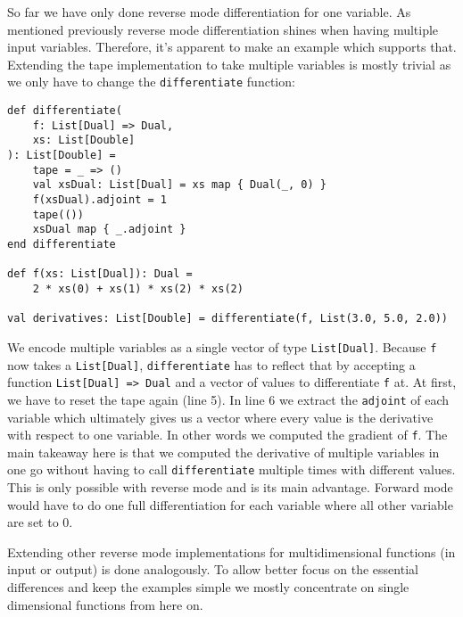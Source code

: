 So far we have only done reverse mode differentiation for one variable. As mentioned previously reverse mode differentiation shines when having multiple input variables. Therefore, it's apparent to make an example which supports that. Extending the tape implementation to take multiple variables is mostly trivial as we only have to change the \lstinline{differentiate} function:
\begin{lstlisting}
def differentiate(
    f: List[Dual] => Dual, 
    xs: List[Double]
): List[Double] =
    tape = _ => ()
    val xsDual: List[Dual] = xs map { Dual(_, 0) }
    f(xsDual).adjoint = 1
    tape(())
    xsDual map { _.adjoint }
end differentiate

def f(xs: List[Dual]): Dual =
    2 * xs(0) + xs(1) * xs(2) * xs(2)

val derivatives: List[Double] = differentiate(f, List(3.0, 5.0, 2.0))
\end{lstlisting}
We encode multiple variables as a single vector of type \lstinline{List[Dual]}. Because \lstinline{f} now takes a \lstinline{List[Dual]}, \lstinline{differentiate} has to reflect that by accepting a function \lstinline{List[Dual] => Dual} and a vector of values to differentiate \lstinline{f} at. At first, we have to reset the tape again (line 5). In line 6 we extract the \lstinline{adjoint} of each variable which ultimately gives us a vector where every value is the derivative with respect to one variable. In other words we computed the gradient of \lstinline{f}. The main takeaway here is that we computed the derivative of multiple variables in one go without having to call \lstinline{differentiate} multiple times with different values. This is only possible with reverse mode and is its main advantage. Forward mode would have to do one full differentiation for each variable where all other variable are set to 0.

Extending other reverse mode implementations for multidimensional functions (in input or output) is done analogously. To allow better focus on the essential differences and keep the examples simple we mostly concentrate on single dimensional functions from here on.